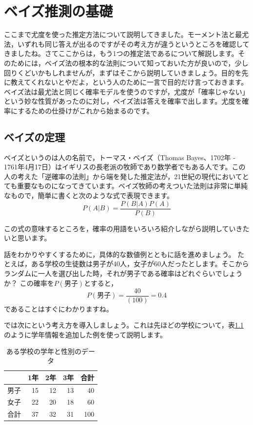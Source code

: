 \documentclass{ltjsbook}
\begin{document}
\chapter{ベイズ推測の基礎}
\label{m25_bayesian}
ここまで尤度を使った推定方法について説明してきました。モーメント法と最尤法，いずれも同じ答えが出るのですがその考え方が違うというところを確認してきましたね。さてここからは，もう1つの推定法であるについて解説します。そのためには，ベイズ法の根本的な法則について知っておいた方が良いので，少し回りくどいかもしれませんが，まずはそこから説明していきましょう。目的を先に教えてくれないとやだよ，という人のために一言で目的だけ言っておきます。ベイズ法は最尤法と同じく確率モデルを使うのですが，尤度が「確率じゃない」という妙な性質があったのに対し，ベイズ法は答えを確率で出します。尤度を確率にするための仕掛けがこれから始まるのです。

\section{ベイズの定理}
ベイズというのは人の名前で，トーマス・ベイズ（Thomas Bayes、1702年 - 1761年4月17日）はイギリスの長老派の牧師であり数学者でもある人です。この人の考えた「逆確率の法則」から端を発した推定法が，21世紀の現代においてとても重要なものになってきています。ベイズ牧師の考えついた法則は非常に単純なもので，簡単に書くと次のような式で表現できます。
\[ P(A|B) = \frac{P(B|A)P(A)}{P(B)} \]

この式の意味するところを，確率の用語をいろいろ紹介しながら説明していきたいと思います。

話をわかりやすくするために，具体的な数値例とともに話を進めましょう。
たとえば，ある学校の生徒数は男子が40人，女子が60人だったとします。そこからランダムに一人を選び出した時，それが男子である確率はどれぐらいでしょうか？ この確率を$P(\mbox{男子})$とすると，
\[P(\mbox{男子})=\frac{40}{(100)}=0.4 \]
であることはすぐにわかりますね。

では次にという考え方を導入しましょう。これは先ほどの学校について，表\ref{tbl::24_02}のように学年情報を追加した例を使って説明します。

\begin{table}[ht]
	\centering
	\caption{ある学校の学年と性別のデータ}
	\begin{tabular}{rrrrr}
		\hline
		   & 1年 & 2年 & 3年 & 合計  \\
		\hline
		男子 & 15 & 12 & 13 & 40  \\
		女子 & 22 & 20 & 18 & 60  \\\hline
		合計 & 37 & 32 & 31 & 100 \\\hline
	\end{tabular}
	\label{tbl::24_02}
\end{table}
\end{document}
